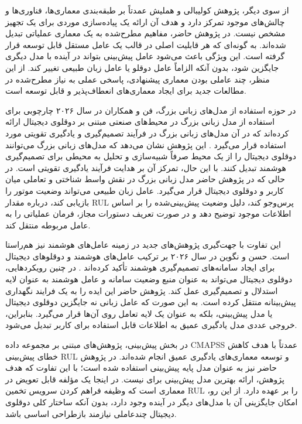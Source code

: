 از سوی دیگر، پژوهش کولیبالی و هملیش عمدتاً بر طبقه‌بندی معماری‌ها،
فناوری‌ها و چالش‌های موجود تمرکز دارد و هدف آن ارائه یک پیاده‌سازی
موردی برای یک تجهیز مشخص نیست. در پژوهش حاضر، مفاهیم مطرح‌شده به یک معماری عملیاتی تبدیل شده‌اند. به گونه‌ای که هر قابلیت
اصلی در قالب یک عامل مستقل قابل توسعه قرار گرفته است. این ویژگی باعث
می‌شود عامل پیش‌بینی بتواند در آینده با مدل دیگری جایگزین شود، بدون
آنکه الزاماً عامل دوقلو یا عامل زبان طبیعی تغییر کند. از این منظر،
چند عاملی بودن معماری پیشنهادی، پاسخی عملی به نیاز مطرح‌شده در مطالعات
جدید برای ایجاد معماری‌های انعطاف‌پذیر و قابل توسعه است.

در حوزه استفاده از مدل‌های زبانی بزرگ،
 فن و همکاران در سال ۲۰۲۶
چارچوبی برای استفاده از مدل زبانی بزرگ در محیط‌های صنعتی مبتنی بر
دوقلوی دیجیتال ارائه کرده‌اند که در آن مدل‌های زبانی بزرگ در فرآیند تصمیم‌گیری و
یادگیری تقویتی مورد استفاده قرار می‌گیرد \cite{fan2026llmrl}. این
پژوهش نشان می‌دهد که مدل‌های زبانی بزرگ می‌توانند دوقلوی دیجیتال را از یک محیط
صرفاً شبیه‌سازی و تحلیل به محیطی برای تصمیم‌گیری هوشمند تبدیل کنند.
با این حال، تمرکز آن بر هدایت فرآیند یادگیری تقویتی است. در حالی که
در پژوهش حاضر مدل زبانی بزرگ در نقش واسط شناختی و تعاملی میان کاربر و دوقلوی
دیجیتال قرار می‌گیرد. عامل زبان طبیعی می‌تواند وضعیت موتور را
بازیابی کند، درباره مقدار \gls{RUL} پرس‌وجو کند، دلیل وضعیت پیش‌بینی‌شده را
بر اساس اطلاعات موجود توضیح دهد و در صورت تعریف دستورات مجاز، فرمان
عملیاتی را به عامل مربوطه منتقل کند.

این تفاوت با جهت‌گیری پژوهش‌های جدید در زمینه عامل‌های هوشمند نیز
هم‌راستا است.
 حسن
 و 
 نگوین
 در سال ۲۰۲۶ بر ترکیب عامل‌های هوشمند و
دوقلوهای دیجیتال برای ایجاد سامانه‌های تصمیم‌گیری هوشمند تأکید
کرده‌اند \cite{hasan2026agenticdt}. در چنین رویکردهایی، دوقلوی دیجیتال
می‌تواند به عنوان منبع وضعیت سامانه و عامل هوشمند به عنوان لایه
استدلال و تصمیم‌گیری عمل کند. پژوهش حاضر این ایده را به یک فرایند
نگهداری پیش‌بینانه منتقل کرده است. به این صورت که عامل زبانی نه
جایگزین دوقلوی دیجیتال یا مدل پیش‌بینی، بلکه به عنوان یک لایه تعامل
روی آن‌ها قرار می‌گیرد. بنابراین، خروجی عددی مدل یادگیری عمیق به
اطلاعات قابل استفاده برای کاربر تبدیل می‌شود.

در بخش پیش‌بینی، پژوهش‌های مبتنی بر مجموعه داده \gls{CMAPSS} عمدتاً
با هدف کاهش خطای پیش‌بینی \gls{RUL} و توسعه معماری‌های یادگیری عمیق انجام
شده‌اند. در پژوهش حاضر نیز  به عنوان مدل پایه پیش‌بینی استفاده
شده است؛ با این تفاوت که هدف پژوهش، ارائه بهترین مدل پیش‌بینی برای
 نیست. 
در اینجا یک مؤلفه قابل تعویض در معماری است که وظیفه
فراهم کردن سرویس تخمین \gls{RUL} را بر عهده دارد. از این رو، امکان جایگزینی
آن با مدل‌های دیگر در آینده وجود دارد، بدون آنکه ساختار کلی دوقلوی
دیجیتال چندعاملی نیازمند بازطراحی اساسی باشد.

